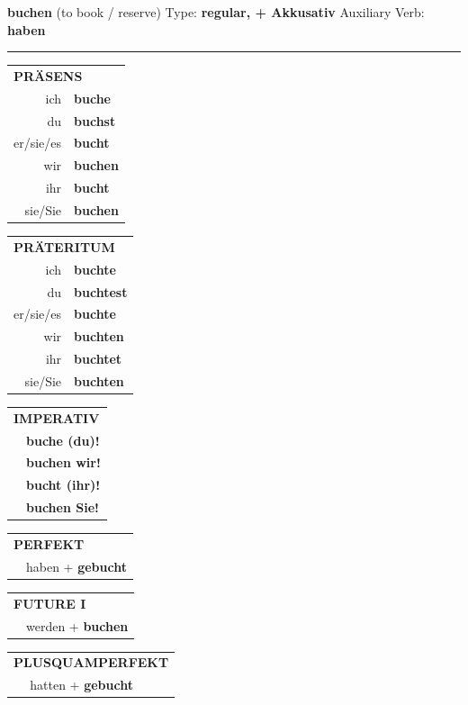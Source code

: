 \documentclass[10pt,a4paper]{revtex4-2}
\begin{document}
\begin{verbbox-acc}
{\Large \bf buchen} (to book / reserve) \hfill Type: \textbf{regular, + Akkusativ} \hfill Auxiliary Verb: \textbf{haben}

\vspace{5pt}
\hrule
\vspace{5pt}

\begin{tabular}{rl}
\multicolumn{2}{l}{\textbf{PRÄSENS}}\\
ich & \textbf{buche}\\
du & \textbf{buchst}\\
er/sie/es & \textbf{bucht}\\
wir & \textbf{buchen}\\
ihr & \textbf{bucht}\\
sie/Sie & \textbf{buchen}\\
\end{tabular}
\hfill
\begin{tabular}{rl}
\multicolumn{2}{l}{\textbf{PRÄTERITUM}}\\
ich & \textbf{buchte}\\
du & \textbf{buchtest}\\
er/sie/es & \textbf{buchte}\\
wir & \textbf{buchten}\\
ihr & \textbf{buchtet}\\
sie/Sie & \textbf{buchten}\\
\end{tabular}
\hfill
\begin{tabular}{rl}
\multicolumn{2}{l}{\textbf{IMPERATIV}}\\
& \textbf{buche (du)!}\\
& \textbf{buchen wir!}\\
& \textbf{bucht (ihr)!}\\
& \textbf{buchen Sie!}\\
\end{tabular}

\vspace{10pt}

\begin{tabular}{rl}
\multicolumn{2}{l}{\textbf{PERFEKT}}\\
& haben + \textbf{gebucht}\\
\end{tabular}
\hfill
\begin{tabular}{rl}
\multicolumn{2}{l}{\textbf{FUTURE I}}\\
& werden + \textbf{buchen}\\
\end{tabular}
\hfill
\begin{tabular}{rl}
\multicolumn{2}{l}{\textbf{PLUSQUAMPERFEKT}}\\
& hatten + \textbf{gebucht}\\
\end{tabular}


\end{verbbox-acc}
\end{document}
